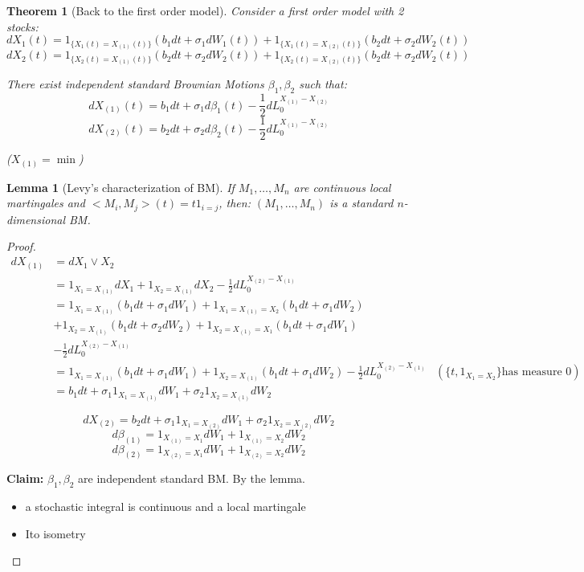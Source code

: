\documentclass{article} \usepackage[utf8]{inputenc}
\newtheorem{theorem}{Theorem}
\newtheorem{lemma}{Lemma}
\begin{document}
  \begin{theorem}[Back to the first order model]
    Consider a first order model with 2 stocks:
    $$dX_1(t) = 1_{\{X_1(t) = X_{(1)}(t)\}} (b_1 dt+ \sigma_1 dW_1(t)) + 1_{\{X_1(t) = X_{(2)}(t)\}} (b_2 dt+ \sigma_2 dW_2(t))$$
    $$dX_2(t) = 1_{\{X_2(t) = X_{(1)}(t)\}} (b_2 dt+ \sigma_2 dW_2(t)) + 1_{\{X_2(t) = X_{(2)}(t)\}} (b_2 dt+ \sigma_2 dW_2(t))$$

    There exist independent standard Brownian Motions $\beta_1, \beta_2$ such that:
    $$dX_{(1)}(t) = b_1 dt + \sigma_1 d\beta_1(t) - \frac12 dL_0^{X_{(1)}-X_{(2)}}$$
    $$dX_{(2)}(t) = b_2 dt + \sigma_2 d\beta_2(t) - \frac12 dL_0^{X_{(1)}-X_{(2)}}$$

    ($X_{(1)} = \min$)
  \end{theorem}
  \begin{lemma}[Levy's characterization of BM]
    If $M_1, \ldots, M_n$ are continuous local martingales and $<M_i, M_j>(t) = t 1_{i = j}$, then:
    $(M_1, \ldots, M_n)$ is a standard $n$-dimensional BM.
  \end{lemma}
  \begin{proof}
    \begin{align*}
      d X_{(1)}  &= d X_1 \vee X_2 \\
                 &= 1_{X_1 = X_{(1)}} dX_1 + 1_{X_2 = X_{(1)}} dX_2 - \frac12 dL_0^{X_{(2)} - X_{(1)}}\\
                 &= 1_{X_1 = X_{(1)}} (b_1 dt + \sigma_1 dW_1) + 1_{X_1 = X_{(1)} = X_2} (b_1 dt + \sigma_1 dW_2)
      \\&+ 1_{X_2 = X_{(1)}} (b_1 dt + \sigma_2 dW_2) + 1_{X_2 = X_{(1)} = X_1} (b_1 dt + \sigma_1 dW_1)
      \\&- \frac12 dL_0^{X_{(2)} - X_{(1)}}
      \\&= 1_{X_1 = X_{(1)}} (b_1 dt + \sigma_1 dW_1) + 1_{X_2 = X_{(1)}} (b_1 dt + \sigma_1 dW_2) - \frac12 dL_0^{X_{(2)} - X_{(1)}}
                 &(\{ t, 1_{X_1 = X_2}\} \text{has measure 0})
      \\&= b_1 dt + \sigma_1 1_{X_1 = X_{(1)}} dW_1 + \sigma_2 1_{X_2 = X_{(1)}} dW_2
    \end{align*}

    $$dX_{(2)} = b_2 dt + \sigma_1 1_{X_1 = X_{(2)}} dW_1 + \sigma_2 1_{X_2 = X_{(2)}} dW_2 $$
    $$d\beta_{(1)} = 1_{X_{(1)} = X_1} dW_1 + 1_{X_{(1)} = X_2} dW_2$$
    $$d\beta_{(2)} = 1_{X_{(2)} = X_1} dW_1 + 1_{X_{(2)} = X_2} dW_2$$
    
    \textbf{Claim:} $\beta_1, \beta_2$ are independent standard BM. By the lemma. 
    \begin{itemize}
    \item a stochastic integral is continuous and a local martingale
    \item Ito isometry
    \end{itemize}
  \end{proof}
\end{document}
